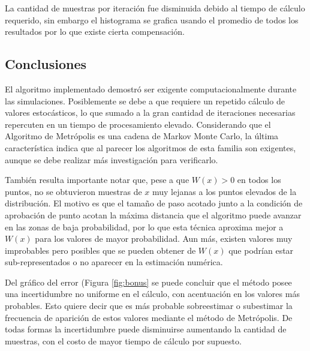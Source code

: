 \documentclass{article}
\begin{document}
La cantidad de muestras por iteración fue disminuida debido al tiempo de cálculo requerido, sin embargo el histograma se grafica usando el promedio de todos los resultados por lo que existe cierta compensación. 


\subsection{Conclusiones}

El algoritmo implementado demostró ser exigente computacionalmente durante las simulaciones. Posiblemente se debe a que requiere un repetido cálculo de valores estocásticos, lo que sumado a la gran cantidad de iteraciones necesarias repercuten en un tiempo de procesamiento elevado. Considerando que el Algoritmo de Metrópolis es una cadena de Markov Monte Carlo, la última característica indica que al parecer los algoritmos de esta familia son exigentes, aunque se debe realizar más investigación para verificarlo. 

También resulta importante notar que, pese a que $W(x) > 0$ en todos los puntos, no se obtuvieron muestras de $x$ muy lejanas a los puntos elevados de la distribución. El motivo es que el tamaño de paso acotado junto a la condición de aprobación de punto acotan la máxima distancia que el algoritmo puede avanzar en las zonas de baja probabilidad, por lo que esta técnica aproxima mejor a $W(x)$ para los valores de mayor probabilidad. Aun más, existen valores muy improbables pero posibles que se pueden obtener de $W(x)$ que podrían estar sub-representados o no aparecer en la estimación numérica.

Del gráfico del error (Figura \ref{fig:bonus} se puede concluir que el método posee una incertidumbre no uniforme en el cálculo, con acentuación en los valores más probables. Esto quiere decir que es más probable sobreestimar o subestimar la frecuencia de aparición de estos valores mediante el método de Metrópolis. De todas formas la incertidumbre puede disminuirse aumentando la cantidad de muestras, con el costo de mayor tiempo de cálculo por supuesto.
\end{document}
